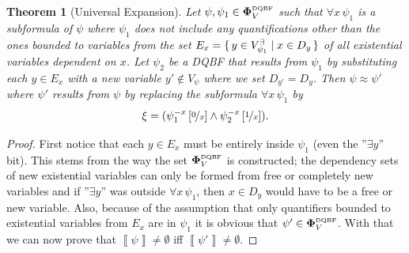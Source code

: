 \documentclass[
  digital, %
  color,
  twoside, %
  table,   %
  nolof,     %
  nolot,     %
]{fithesis3}
\let\setbuilder\set
\newcommand{\simpleset}[1]{\{{#1}\}}
\renewcommand{\set}[1]{\normalexpandarg\IfSubStr{#1}{|}{\setbuilder{#1}}{\simpleset{#1}}}
\newtheorem{theorem}{Theorem}[chapter] %
\theoremstyle{definition}
\theoremstyle{remark}
\newcommand{\seman}[1]{\left\llbracket {#1} \right\rrbracket}
\newcommand{\substitute}[2]{\left[ \nicefrac{#2}{#1} \right]}
\newcommand{\DQBF}[1]{\mathbf{\Phi}_{#1}^{\normalfont{\text{\tiny DQBF}}}}
\newcommand{\evars}[1]{V_{#1}^{\exists}}
\newcommand{\itholds}{\,}
\begin{document}
\begin{theorem}[Universal Expansion]
\label{thrm:unExpan}
  Let $\psi, \psi_1 \in \DQBF{V}$ such that $\forall x \itholds \psi_1$ is a subformula of $\psi$ where $\psi_1$ does not include any quantifications other than the ones bounded to variables from the set $E_{x} = \set{y \in \evars{\psi_1} | x \in D_y}$ of all existential variables dependent on $x$. Let $\psi_2$ be a DQBF that results from $\psi_1$ by substituting each $y \in E_x$ with a new variable $y' \not\in V_{\psi}$ where we set $D_{y'} = D_y$. Then $\psi \approx \psi'$ where $\psi'$ results from $\psi$ by replacing the subformula $\forall x \itholds \psi_1$ by 
  \[\xi = (\psi_1^{-x}\substitute{x}{0} \land \psi_2^{-x}\substitute{x}{1}).\]
\end{theorem}
\begin{proof}
  First notice that each $y \in E_x$ must be entirely inside $\psi_1$ (even the ''$\exists y$'' bit). This stems from the way the set $\DQBF{V}$ is constructed; the dependency sets of new existential variables can only be formed from free or completely new variables and if ''$\exists y$'' was outside $\forall x \itholds \psi_1$, then $x \in D_y$ would have to be a free or new variable. Also, because of the assumption that only quantifiers bounded to existential variables from $E_x$
  are in $\psi_1$ it is obvious that $\psi' \in \DQBF{V}$. With that we can now prove that $\seman{\psi} \not= \emptyset$ iff $\seman{\psi'} \not= \emptyset$.
  

\end{proof}
\end{document}
